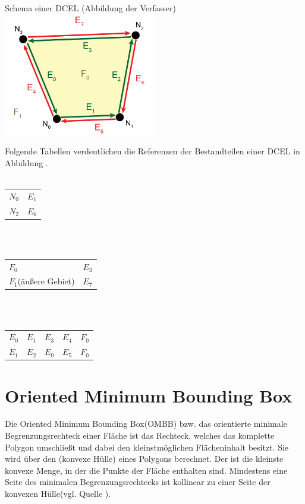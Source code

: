 \begin{Bild}{Schema einer DCEL (Abbildung der Verfasser)}
	\includegraphics[width=250px]{Bilder/DCEL-10}
\end{Bild}

Folgende Tabellen verdeutlichen die Referenzen der Bestandteilen einer DCEL in Abbildung \thebildnr.\\\\

\begin{tabularx}{\textwidth}{|Y|Y|}
	\hline
	 &  \\
	\hline
	$N_0$ & $E_1$ \\
	\hline
	$N_2$ & $E_6$ \\
	\hline
\end{tabularx}\\\\

\begin{tabularx}{\textwidth}{|Y|Y|}
	\hline
	 &  \\
	\hline
	$F_0$ & $E_3$ \\
	\hline
	$F_1$(äußere Gebiet) & $E_7$ \\
	\hline
\end{tabularx}\\\\

\begin{tabularx}{\textwidth}{|Y|Y|Y|Y|Y|}
	\hline
	 &  &  &  &  \\
	\hline
	$E_0$ & $E_1$ & $E_3$& $E_4$& $F_0$ \\
	\hline
	$E_1$ & $E_2$ & $E_0$& $E_5$& $F_0$ \\
	\hline
\end{tabularx}

\section{Oriented Minimum Bounding Box}
Die Oriented Minimum Bounding Box(OMBB) bzw. das orientierte minimale Begrenzungsrechteck einer Fläche ist das Rechteck, welches das komplette Polygon umschließt und dabei den kleinstmöglichen Flächeninhalt besitzt.
Sie wird über den  (konvexe Hülle) eines Polygons berechnet.
Der  ist die kleinste konvexe Menge, in der die Punkte der Fläche enthalten sind.
Mindestens eine Seite des minimalen Begrenzungsrechtecks ist kollinear zu einer Seite der konvexen Hülle(vgl. Quelle \cite{ombb}).


